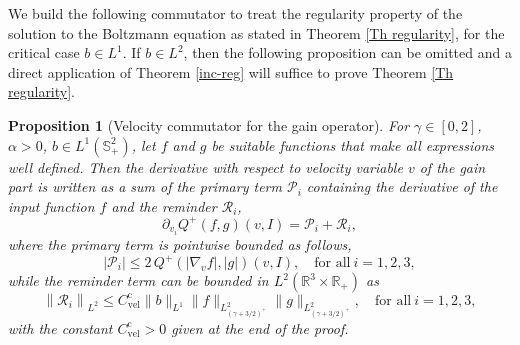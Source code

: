 \documentclass[11pt,a4paper]{amsart}
\newcommand{\bRp}{\mathbb{R}_+}
\newcommand{\bRfp}{\mathbb{R}^3 \times \bRp}
\newcommand{\bSp}{\mathbb{S}^2_+}
\newcommand{\g}{\gamma}
\newcommand{\R}{\mathcal{R}}
\newcommand{\Prim}{\mathcal{P}}
\newcommand{\Ccmvel}{C_{\text{vel}}^{\text{c}}}
\newtheorem{proposition}[theorem]{Proposition}
\begin{document}
 We build the following commutator to treat the regularity property of the solution to the Boltzmann equation as stated in Theorem \ref{Th regularity}, for the critical case $b \in L^1$. If $b\in L^2$, then the following proposition can be omitted and a direct application of Theorem \ref{inc-reg} will suffice to prove Theorem \ref{Th regularity}. 

\begin{proposition}[Velocity commutator for the gain operator]\label{inc-reg-b1}
	For $\gamma\in[0,2]$, $\alpha > 0$, $b\in L^{1}(\bSp)$, let $f$ and $g$ be suitable functions  that make all expressions well defined.  Then the derivative with respect to velocity variable $v$ of the gain part is written as a sum of the primary term $\Prim_i$ containing the derivative of the input function $f$ and the reminder $\R_i$,
	\begin{equation}\label{der Q+ wrt vi}
\partial_{v_i} 	Q^+(f,g)(v,I) = \Prim_i + \R_i,
	\end{equation}
where the primary term is pointwise  bounded as follows,
	\begin{equation}\label{th eq prim vel}
		|\Prim_i| \leq  2   \, Q^+\left( \left| \nabla_{v}  f \right|,  \left| g \right|  \right)(v,I), \quad \text{for all} \ i=1,2,3,
	\end{equation}
while the reminder term can be bounded in $L^2(\bRfp)$ as
			\begin{equation}\label{th eq rem vel}
\left\| 	\R_i  \right\|_{L^2}	 \leq 
	\Ccmvel  \| b \|_{{L^{1}}}   	\| f \|_{L^{2}_{(\g+3/2)^+}}\| g \|_{L^{2}_{(\g+3/2)^+}}, \quad \text{for all} \ i=1,2,3,
	\end{equation}
	with  the constant $\Ccmvel>0$ given at the end of the proof.
\end{proposition}
 
\end{document}
